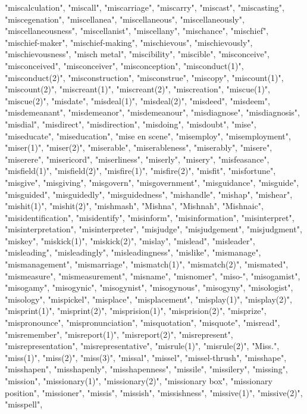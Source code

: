 "miscalculation",
"miscall",
"miscarriage",
"miscarry",
"miscast",
"miscasting",
"miscegenation",
"miscellanea",
"miscellaneous",
"miscellaneously",
"miscellaneousness",
"miscellanist",
"miscellany",
"mischance",
"mischief",
"mischief-maker",
"mischief-making",
"mischievous",
"mischievously",
"mischievousness",
"misch metal",
"miscibility",
"miscible",
"misconceive",
"misconceived",
"misconceiver",
"misconception",
"misconduct(1)",
"misconduct(2)",
"misconstruction",
"misconstrue",
"miscopy",
"miscount(1)",
"miscount(2)",
"miscreant(1)",
"miscreant(2)",
"miscreation",
"miscue(1)",
"miscue(2)",
"misdate",
"misdeal(1)",
"misdeal(2)",
"misdeed",
"misdeem",
"misdemeanant",
"misdemeanor",
"misdemeanour",
"misdiagnose",
"misdiagnosis",
"misdial",
"misdirect",
"misdirection",
"misdoing",
"misdoubt",
"mise",
"miseducate",
"miseducation",
"mise en scene",
"misemploy",
"misemployment",
"miser(1)",
"miser(2)",
"miserable",
"miserableness",
"miserably",
"misere",
"miserere",
"misericord",
"miserliness",
"miserly",
"misery",
"misfeasance",
"misfield(1)",
"misfield(2)",
"misfire(1)",
"misfire(2)",
"misfit",
"misfortune",
"misgive",
"misgiving",
"misgovern",
"misgovernment",
"misguidance",
"misguide",
"misguided",
"misguidedly",
"misguidedness",
"mishandle",
"mishap",
"mishear",
"mishit(1)",
"mishit(2)",
"mishmash",
"Mishna",
"Mishnah",
"Mishnaic",
"misidentification",
"misidentify",
"misinform",
"misinformation",
"misinterpret",
"misinterpretation",
"misinterpreter",
"misjudge",
"misjudgement",
"misjudgment",
"miskey",
"miskick(1)",
"miskick(2)",
"mislay",
"mislead",
"misleader",
"misleading",
"misleadingly",
"misleadingness",
"mislike",
"mismanage",
"mismanagement",
"mismarriage",
"mismatch(1)",
"mismatch(2)",
"mismated",
"mismeasure",
"mismeasurement",
"misname",
"misnomer",
"miso-",
"misogamist",
"misogamy",
"misogynic",
"misogynist",
"misogynous",
"misogyny",
"misologist",
"misology",
"mispickel",
"misplace",
"misplacement",
"misplay(1)",
"misplay(2)",
"misprint(1)",
"misprint(2)",
"misprision(1)",
"misprision(2)",
"misprize",
"mispronounce",
"mispronunciation",
"misquotation",
"misquote",
"misread",
"misremember",
"misreport(1)",
"misreport(2)",
"misrepresent",
"misrepresentation",
"misrepresentative",
"misrule(1)",
"misrule(2)",
"Miss.",
"miss(1)",
"miss(2)",
"miss(3)",
"missal",
"missel",
"missel-thrush",
"misshape",
"misshapen",
"misshapenly",
"misshapenness",
"missile",
"missilery",
"missing",
"mission",
"missionary(1)",
"missionary(2)",
"missionary box",
"missionary position",
"missioner",
"missis",
"missish",
"missishness",
"missive(1)",
"missive(2)",
"misspell",
